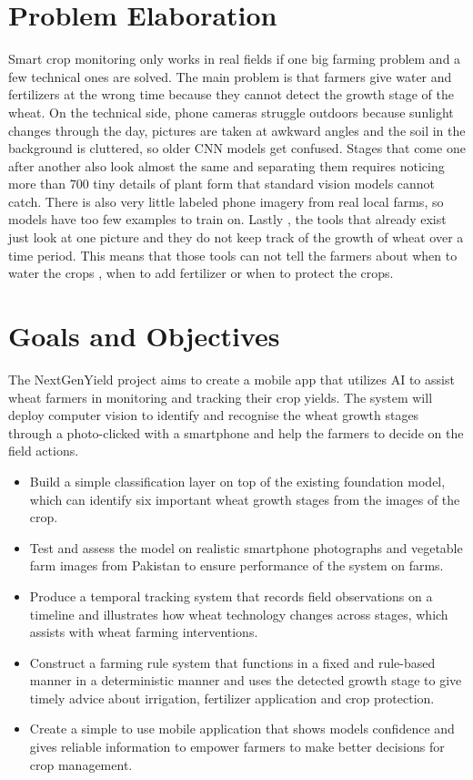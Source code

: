 \documentclass{FastFyp}
\begin{document}
\section{Problem Elaboration}
Smart crop monitoring only works in real fields if one big farming problem and a few technical ones are solved. The main problem is that farmers give water and fertilizers at the wrong time because they cannot detect the growth stage of the wheat. On the technical side, phone cameras struggle outdoors because sunlight changes through the day, pictures are taken at awkward angles and the soil in the background is cluttered, so older CNN models get confused. Stages that come one after another also look almost the same and separating them requires noticing more than 700 tiny details of plant form that standard vision models cannot catch. There is also very little labeled phone imagery from real local farms, so models have too few examples to train on. Lastly , the tools that already exist just look at one picture and they do not keep track of the growth of wheat over a time period. This means that those tools can not tell the farmers about when to water the crops , when to add fertilizer or when to protect the crops. 
\section{Goals and Objectives}
The NextGenYield project aims to create a mobile app that utilizes AI to assist wheat farmers in monitoring and tracking their crop yields. The system will deploy computer vision to identify and recognise the wheat growth stages through a photo-clicked with a smartphone and help the farmers to decide on the field actions.

\begin{itemize}
    \item Build a simple classification layer on top of the existing foundation model, which can identify six important wheat growth stages from the images of the crop.
    \item Test and assess the model on realistic smartphone photographs and vegetable farm images from Pakistan to ensure performance of the system on farms.
    \item Produce a temporal tracking system that records field observations on a timeline and illustrates how wheat technology changes across stages, which assists with wheat farming interventions.
    \item Construct a farming rule system that functions in a fixed and rule-based manner in a deterministic manner and uses the detected growth stage to give timely advice about irrigation, fertilizer application and crop protection.
    \item Create a simple to use mobile application that shows models confidence and gives reliable information to empower farmers to make better decisions for crop management.
\end{itemize}
 
\end{document}

